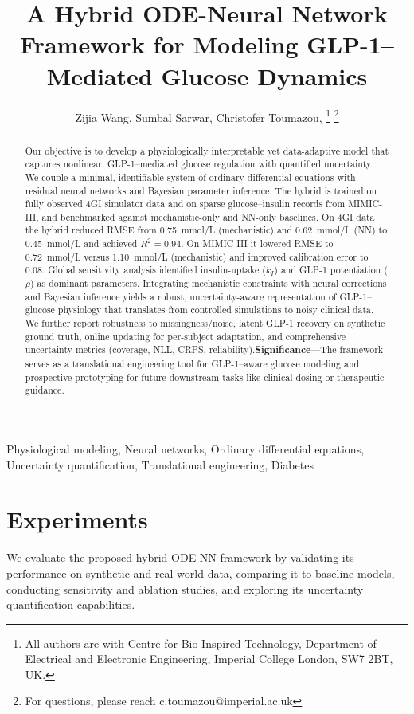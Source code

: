 \documentclass[9pt,shortpaper,twoside,web]{ieeecolor}
\begin{document}
\title{A Hybrid ODE-Neural Network Framework for Modeling GLP-1–Mediated Glucose Dynamics}
\author{Zijia Wang, Sumbal Sarwar, Christofer Toumazou, 
\thanks{All authors are with Centre for Bio-Inspired Technology, Department of Electrical and Electronic Engineering, Imperial College London, SW7 2BT, UK.}
\thanks{For questions, please reach c.toumazou@imperial.ac.uk}}
\maketitle
\begin{abstract}
Our objective is to develop a physiologically interpretable yet data-adaptive model that captures nonlinear, GLP-1–mediated glucose regulation with quantified uncertainty. We couple a minimal, identifiable system of ordinary differential equations with residual neural networks and Bayesian parameter inference. The hybrid is trained on fully observed 4GI simulator data and on sparse glucose–insulin records from MIMIC-III, and benchmarked against mechanistic-only and NN-only baselines. On 4GI data the hybrid reduced RMSE from \SI{0.75}{mmol/L} (mechanistic) and \SI{0.62}{mmol/L} (NN) to \SI{0.45}{mmol/L} and achieved $R^2=0.94$. On MIMIC-III it lowered RMSE to \SI{0.72}{mmol/L} versus \SI{1.10}{mmol/L} (mechanistic) and improved calibration error to 0.08. Global sensitivity analysis identified insulin-uptake ($k_I$) and GLP-1 potentiation ($\rho$) as dominant parameters. Integrating mechanistic constraints with neural corrections and Bayesian inference yields a robust, uncertainty-aware representation of GLP-1–glucose physiology that translates from controlled simulations to noisy clinical data. We further report robustness to missingness/noise, latent GLP-1 recovery on synthetic ground truth, online updating for per-subject adaptation, and comprehensive uncertainty metrics (coverage, NLL, CRPS, reliability).\textbf{Significance}—The framework serves as a translational engineering tool for GLP-1–aware glucose modeling and prospective prototyping for future downstream tasks like clinical dosing or therapeutic guidance.
\end{abstract}
\begin{IEEEkeywords}
Physiological modeling, Neural networks, Ordinary differential equations, Uncertainty quantification, Translational engineering, Diabetes
\end{IEEEkeywords}
\section{Experiments}\label{sec:experiments}
We evaluate the proposed hybrid ODE-NN framework by validating its performance on synthetic and real-world data, comparing it to baseline models, conducting sensitivity and ablation studies, and exploring its uncertainty quantification capabilities.
\end{document}
